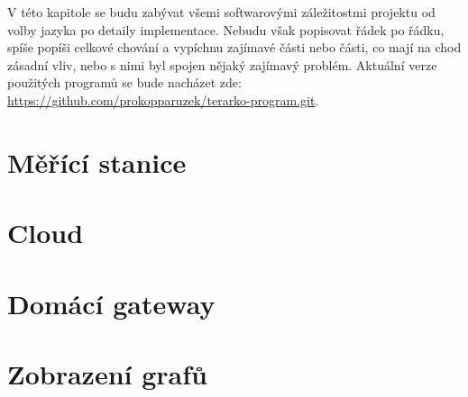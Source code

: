 V této kapitole se budu zabývat všemi softwarovými záležitostmi projektu od volby jazyka po detaily implementace. Nebudu 
však popisovat řádek po řádku, spíše popíši celkové chování a vypíchnu zajímavé části nebo části, co mají na chod 
zásadní vliv, nebo s nimi byl spojen nějaký zajímavý problém. Aktuální verze použitých programů se bude nacházet zde: 
\url{https://github.com/prokopparuzek/terarko-program.git}.
\section{Měřící stanice}

\section{Cloud}

\section{Domácí gateway}

\section{Zobrazení grafů}

